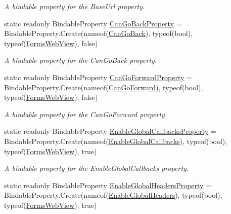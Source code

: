 \begin{DoxyCompactItemize}
\begin{DoxyCompactList}\small\item\em A bindable property for the Base\+Url property. \end{DoxyCompactList}\item 
static readonly Bindable\+Property \hyperlink{class_xam_1_1_plugin_1_1_web_view_1_1_abstractions_1_1_forms_web_view_ade895cc9c4842b6547d059a28049f851}{Can\+Go\+Back\+Property} = Bindable\+Property.\+Create(nameof(\hyperlink{class_xam_1_1_plugin_1_1_web_view_1_1_abstractions_1_1_forms_web_view_a59e06c36a967be7d282fad49ad08fe8b}{Can\+Go\+Back}), typeof(bool), typeof(\hyperlink{class_xam_1_1_plugin_1_1_web_view_1_1_abstractions_1_1_forms_web_view}{Forms\+Web\+View}), false)
\begin{DoxyCompactList}\small\item\em A bindable property for the Can\+Go\+Back property. \end{DoxyCompactList}\item 
static readonly Bindable\+Property \hyperlink{class_xam_1_1_plugin_1_1_web_view_1_1_abstractions_1_1_forms_web_view_a28c4c26f0cbb0def7a8e25b39736dbfa}{Can\+Go\+Forward\+Property} = Bindable\+Property.\+Create(nameof(\hyperlink{class_xam_1_1_plugin_1_1_web_view_1_1_abstractions_1_1_forms_web_view_aa311b0f3eff14d5edc8e37f42175168e}{Can\+Go\+Forward}), typeof(bool), typeof(\hyperlink{class_xam_1_1_plugin_1_1_web_view_1_1_abstractions_1_1_forms_web_view}{Forms\+Web\+View}), false)
\begin{DoxyCompactList}\small\item\em A bindable property for the Can\+Go\+Forward property. \end{DoxyCompactList}\item 
static readonly Bindable\+Property \hyperlink{class_xam_1_1_plugin_1_1_web_view_1_1_abstractions_1_1_forms_web_view_a6f2e5d107b42e25203b7d6b3af51cf29}{Enable\+Global\+Callbacks\+Property} = Bindable\+Property.\+Create(nameof(\hyperlink{class_xam_1_1_plugin_1_1_web_view_1_1_abstractions_1_1_forms_web_view_a1aa4c45b99c24d381fbe978a3d85cb25}{Enable\+Global\+Callbacks}), typeof(bool), typeof(\hyperlink{class_xam_1_1_plugin_1_1_web_view_1_1_abstractions_1_1_forms_web_view}{Forms\+Web\+View}), true)
\begin{DoxyCompactList}\small\item\em A bindable property for the Enable\+Global\+Callbacks property. \end{DoxyCompactList}\item 
static readonly Bindable\+Property \hyperlink{class_xam_1_1_plugin_1_1_web_view_1_1_abstractions_1_1_forms_web_view_a7dab101868bc012944c3e5b50022634d}{Enable\+Global\+Headers\+Property} = Bindable\+Property.\+Create(nameof(\hyperlink{class_xam_1_1_plugin_1_1_web_view_1_1_abstractions_1_1_forms_web_view_a67ec337bf46584a17f2197fd2fe12b93}{Enable\+Global\+Headers}), typeof(bool), typeof(\hyperlink{class_xam_1_1_plugin_1_1_web_view_1_1_abstractions_1_1_forms_web_view}{Forms\+Web\+View}), true)

\end{DoxyCompactItemize}
